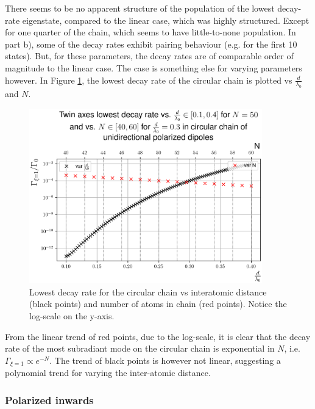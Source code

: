 \documentclass{article}
\begin{document}
There seems to be no apparent structure of the population of the lowest decay-rate eigenstate, compared to the linear case, which was highly structured. Except for one quarter of the chain, which seems to have little-to-none population. In part b), some of the decay rates exhibit pairing behaviour (e.g. for the first 10 states). But, for these parameters, the decay rates are of comparable order of magnitude to the linear case. The case is something else for varying parameters however. In Figure \ref{fig:circular_unidirectional_varying}, the lowest decay rate of the circular chain is plotted vs $\frac{d}{\lambda_0}$ and $N$. 

\begin{figure}[H]
    \centering
    \includegraphics[width=0.9\textwidth]{figs/case_circular_unidirectional_var_distance_01_04_var_N_40_60_lowest.png}
    \caption{Lowest decay rate for the circular chain vs interatomic distance (black points) and number of atoms in chain (red points). Notice the log-scale on the y-axis. }
    \label{fig:circular_unidirectional_varying}
\end{figure}

From the linear trend of red points, due to the log-scale, it is clear that the decay rate of the most subradiant mode on the circular chain is exponential in $N$, i.e. $\Gamma_{\xi=1} \propto e^{-N}$. The trend of black points is however not linear, suggesting a polynomial trend for varying the inter-atomic distance. 

\subsubsection{Polarized inwards}
\end{document}

